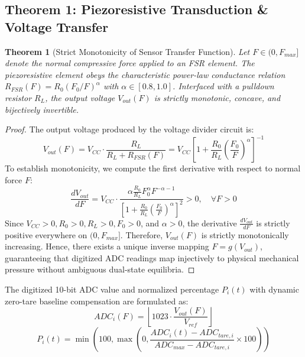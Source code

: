 \documentclass[conference]{IEEEtran}
\newtheorem{theorem}{Theorem}
\begin{document}
\subsection{Theorem 1: Piezoresistive Transduction \& Voltage Transfer}
\begin{theorem}[Strict Monotonicity of Sensor Transfer Function]
Let $F \in (0, F_{max}]$ denote the normal compressive force applied to an FSR element. The piezoresistive element obeys the characteristic power-law conductance relation $R_{FSR}(F) = R_0 (F_0 / F)^\alpha$ with $\alpha \in [0.8, 1.0]$. Interfaced with a pulldown resistor $R_L$, the output voltage $V_{out}(F)$ is strictly monotonic, concave, and bijectively invertible.
\end{theorem}

\begin{proof}
The output voltage produced by the voltage divider circuit is:
\begin{equation}
V_{out}(F) = V_{CC} \cdot \frac{R_L}{R_L + R_{FSR}(F)} = V_{CC} \left[ 1 + \frac{R_0}{R_L} \left( \frac{F_0}{F} \right)^\alpha \right]^{-1}
\label{eq:divider}
\end{equation}
To establish monotonicity, we compute the first derivative with respect to normal force $F$:
\begin{equation}
\frac{dV_{out}}{dF} = V_{CC} \cdot \frac{\alpha \frac{R_0}{R_L} F_0^\alpha F^{-\alpha - 1}}{\left[ 1 + \frac{R_0}{R_L} \left( \frac{F_0}{F} \right)^\alpha \right]^2} > 0, \quad \forall F > 0
\label{eq:derivative}
\end{equation}
Since $V_{CC} > 0, R_0 > 0, R_L > 0, F_0 > 0$, and $\alpha > 0$, the derivative $\frac{dV_{out}}{dF}$ is strictly positive everywhere on $(0, F_{max}]$. Therefore, $V_{out}(F)$ is strictly monotonically increasing. Hence, there exists a unique inverse mapping $F = g(V_{out})$, guaranteeing that digitized ADC readings map injectively to physical mechanical pressure without ambiguous dual-state equilibria.
\end{proof}

The digitized 10-bit ADC value and normalized percentage $P_i(t)$ with dynamic zero-tare baseline compensation are formulated as:
\begin{equation}
ADC_i(F) = \left\lfloor 1023 \cdot \frac{V_{out}(F)}{V_{ref}} \right\rfloor
\label{eq:adc}
\end{equation}
\begin{equation}
P_i(t) = \min\left(100, \max\left(0, \frac{ADC_i(t) - ADC_{tare, i}}{ADC_{max} - ADC_{tare, i}} \times 100\right)\right)
\label{eq:tare}
\end{equation}
\end{document}
